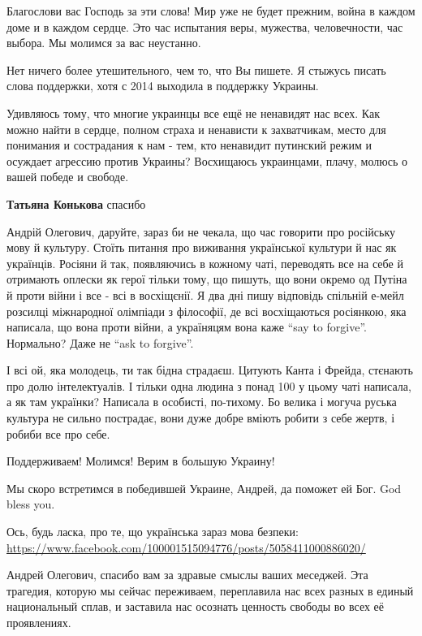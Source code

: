 \begin{itemize}

Благослови вас Господь за эти слова! Мир уже не будет прежним, война в каждом
доме и в каждом сердце. Это час испытания веры, мужества,
человечности, час выбора. Мы молимся за вас неустанно.


Нет ничего более утешительного, чем то, что Вы пишете. Я стыжусь писать слова
поддержки, хотя с 2014 выходила в поддержку Украины.

Удивляюсь тому, что многие украинцы все ещё не ненавидят нас всех. Как можно
найти в сердце, полном страха и ненависти к захватчикам, место для понимания и
сострадания к нам - тем, кто ненавидит путинский режим и осуждает агрессию
против Украины? Восхищаюсь украинцами, плачу, молюсь о вашей победе и свободе.

\textbf{Татьяна Конькова} спасибо


Андрій Олегович, даруйте, зараз би не чекала, що час говорити про російську
мову й культуру. Стоїть питання про виживання української культури й нас як
українців. Росіяни й так, появляючись в кожному чаті, переводять все на себе й
отримають оплески як герої тільки тому, що пишуть, що вони окремо од Путіна й
проти війни і все - всі в восхіщєнії. Я два дні пишу відповідь спільній е-мейл
розсилці міжнародної олімпіади з філософії, де всі восхіщаються росіянкою, яка
написала, що вона проти війни, а україняцям вона каже \enquote{say to forgive}.
Нормально? Даже не \enquote{ask to forgive}.

І всі ой, яка молодець, ти так бідна страдаєш. Цитують Канта і Фрейда, стєнають
про долю інтелектуалів. І тільки одна людина з понад 100 у цьому чаті написала,
а як там українки? Написала в особисті, по-тихому. Бо велика і могуча руська
культура не сильно пострадає, вони дуже добре вміють робити з себе жертв, і
робиби все про себе.

Поддерживаем!
Молимся!
Верим в большую Украину!

Мы скоро встретимся в победившей Украине, Андрей, да поможет ей Бог. God bless you.

Ось, будь ласка, про те, що українська зараз мова безпеки:
\url{https://www.facebook.com/100001515094776/posts/5058411000886020/}


Андрей Олегович, спасибо вам за здравые смыслы ваших меседжей. Эта трагедия,
которую мы сейчас переживаем, переплавила нас всех разных в единый национальный
сплав, и заставила нас осознать ценность свободы во всех её проявлениях.


\end{itemize}
